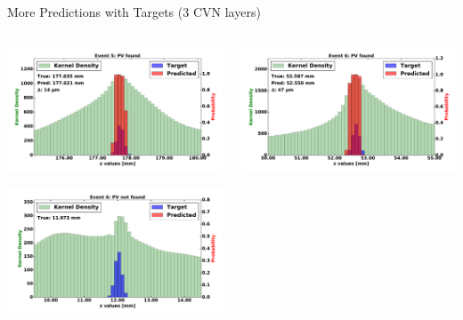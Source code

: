 \begin{frame}{More Predictions with Targets (3 CVN layers)}
  \begin{columns}[c]
        \begin{center}
            \includegraphics[width=1\textwidth,height=0.45\textwidth, trim=18 0 18 0]{images/120000_3layer_36.pdf}
    
            \includegraphics[width=1\textwidth, height=0.45\textwidth,trim=18 0 18 0]{images/120000_3layer_37.pdf}

        \end{center}
        \begin{center}
           \includegraphics[width=1\textwidth, height=0.45\textwidth, trim=18 0 18 0]{images/120000_3layer_38.pdf}
    

\end{center}
\end{columns}
\end{frame}

